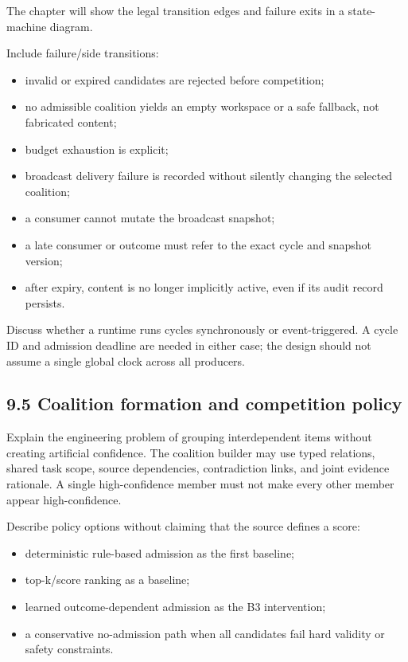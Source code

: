 The chapter will show the legal transition edges and failure exits in a state-machine diagram.

Include failure/side transitions:

\begin{itemize}
\tightlist
\item
  invalid or expired candidates are rejected before competition;
\item
  no admissible coalition yields an empty workspace or a safe fallback, not fabricated content;
\item
  budget exhaustion is explicit;
\item
  broadcast delivery failure is recorded without silently changing the selected coalition;
\item
  a consumer cannot mutate the broadcast snapshot;
\item
  a late consumer or outcome must refer to the exact cycle and snapshot version;
\item
  after expiry, content is no longer implicitly active, even if its audit record persists.
\end{itemize}

Discuss whether a runtime runs cycles synchronously or event-triggered. A cycle ID and admission deadline are needed in either case; the design should not assume a single global clock across all producers.

\subsection{9.5 Coalition formation and competition policy}\label{95-coalition-formation-and-competition-policy}

Explain the engineering problem of grouping interdependent items without creating artificial confidence. The coalition builder may use typed relations, shared task scope, source dependencies, contradiction links, and joint evidence rationale. A single high-confidence member must not make every other member appear high-confidence.

Describe policy options without claiming that the source defines a score:

\begin{itemize}
\tightlist
\item
  deterministic rule-based admission as the first baseline;
\item
  top-k/score ranking as a baseline;
\item
  learned outcome-dependent admission as the B3 intervention;
\item
  a conservative no-admission path when all candidates fail hard validity or safety constraints.
\end{itemize}

